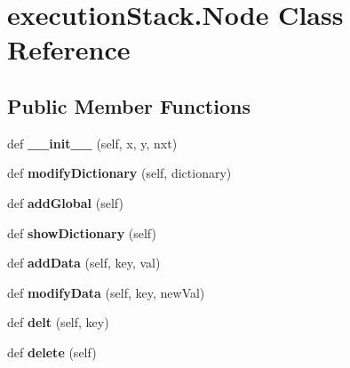 \hypertarget{classexecution_stack_1_1_node}{}\section{execution\+Stack.\+Node Class Reference}
\label{classexecution_stack_1_1_node}
\subsection*{Public Member Functions}
\begin{DoxyCompactItemize}
\item 
def {\bfseries \+\_\+\+\_\+init\+\_\+\+\_\+} (self, x, y, nxt)\hypertarget{classexecution_stack_1_1_node_a06210944064630822c82b75dfbb39b02}{}\label{classexecution_stack_1_1_node_a06210944064630822c82b75dfbb39b02}

\item 
def {\bfseries modify\+Dictionary} (self, dictionary)\hypertarget{classexecution_stack_1_1_node_a8f6113c2ecc9b3750c2623e4f80fbcb6}{}\label{classexecution_stack_1_1_node_a8f6113c2ecc9b3750c2623e4f80fbcb6}

\item 
def {\bfseries add\+Global} (self)\hypertarget{classexecution_stack_1_1_node_ad09bf2598ac130da3d81990e7a3d4033}{}\label{classexecution_stack_1_1_node_ad09bf2598ac130da3d81990e7a3d4033}

\item 
def {\bfseries show\+Dictionary} (self)\hypertarget{classexecution_stack_1_1_node_acce8dc5b25b98507443871806561b712}{}\label{classexecution_stack_1_1_node_acce8dc5b25b98507443871806561b712}

\item 
def {\bfseries add\+Data} (self, key, val)\hypertarget{classexecution_stack_1_1_node_a1edf851a964aeb75e36218af75d84fa5}{}\label{classexecution_stack_1_1_node_a1edf851a964aeb75e36218af75d84fa5}

\item 
def {\bfseries modify\+Data} (self, key, new\+Val)\hypertarget{classexecution_stack_1_1_node_adaa2133dac332801505899ae26425841}{}\label{classexecution_stack_1_1_node_adaa2133dac332801505899ae26425841}

\item 
def {\bfseries delt} (self, key)\hypertarget{classexecution_stack_1_1_node_a4998dd88ab9c688f7d68863d2d7b8f35}{}\label{classexecution_stack_1_1_node_a4998dd88ab9c688f7d68863d2d7b8f35}

\item 
def {\bfseries delete} (self)\hypertarget{classexecution_stack_1_1_node_ade5473ebe64896f68673f0d5830733bb}{}\label{classexecution_stack_1_1_node_ade5473ebe64896f68673f0d5830733bb}

\end{DoxyCompactItemize}
